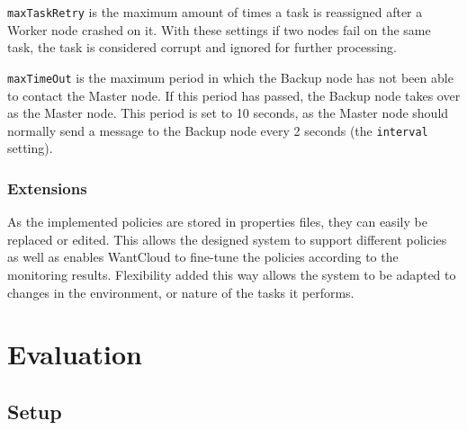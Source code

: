 \documentclass{acm_proc_article-sp}
\begin{document}
\texttt{maxTaskRetry} is the maximum amount of times a task is reassigned after a Worker node crashed on it.
With these settings if two nodes fail on the same task, the task is considered corrupt and ignored for further processing.

\texttt{maxTimeOut} is the maximum period in which the Backup node has not been able to contact the Master node.
If this period has passed, the Backup node takes over as the Master node.
This period is set to 10 seconds, as the Master node should normally send a message to the Backup node every 2 seconds (the \texttt{interval} setting).

\subsubsection{Extensions}
As the implemented policies are stored in properties files, they can easily be replaced or edited.
This allows the designed system to support different policies as well as enables WantCloud to fine-tune the policies according to the monitoring results.
Flexibility added this way allows the system to be adapted to changes in the environment, or nature of the tasks it performs.

\section{Evaluation}
\label{sec:eval}

\subsection{Setup}
\end{document}
